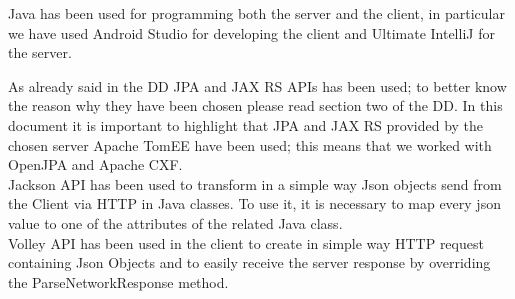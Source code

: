 Java has been used for programming both the server and the client, in particular we have used Android Studio for developing the client and Ultimate IntelliJ for the server.

As already said in the DD JPA and JAX RS APIs has been used; to better know the reason why they have been chosen please read section two of the DD. In this document it is important to highlight that JPA and JAX RS provided by the chosen server Apache TomEE have been used; this means that we worked with OpenJPA and Apache CXF.\\ 
Jackson API has been used to transform in a simple way Json objects send from the Client via HTTP in Java classes. To use it, it is necessary to map every json value to one of the attributes of the related Java class.\\
Volley API has been used in the client to create in simple way HTTP request containing Json Objects and to easily receive the server response by overriding the ParseNetworkResponse method.
